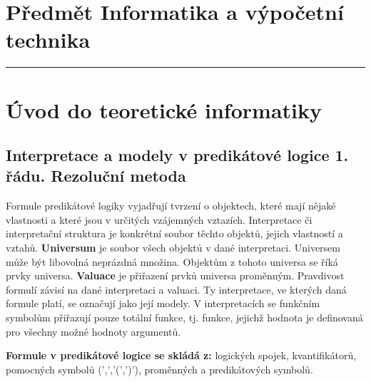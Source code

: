 \section*{Předmět Informatika a výpočetní technika}
\noindent\rule{\textwidth}{1pt}

\section{Úvod do teoretické informatiky}
\subsection{Interpretace a modely v predikátové logice 1. řádu. Rezoluční metoda}
Formule predikátové logiky vyjadřují tvrzení o objektech, které mají nějaké vlastnosti a které jsou v určitých vzájemných vztazích.
Interpretace či interpretační struktura je konkrétní soubor těchto objektů, jejich vlastností a vztahů. \textbf{Universum} je soubor všech objektů v dané interpretaci. Universem může být libovolná neprázdná množina. Objektům z tohoto universa se říká prvky universa. \textbf{Valuace} je přiřazení prvků universa proměnným.
Pravdivost formulí závisí na dané interpretaci a valuaci. Ty interpretace, ve kterých daná formule platí, se označují jako její modely.
V interpretacích se funkčním symbolům přiřazují pouze totální funkce, tj. funkce, jejichž hodnota je definovaná pro všechny možné hodnoty argumentů.

\textbf{Formule v predikátové logice se skládá z:} logických spojek, kvantifikátorů, pomocných symbolů (',','(',')'), proměnných a predikátových symbolů.

